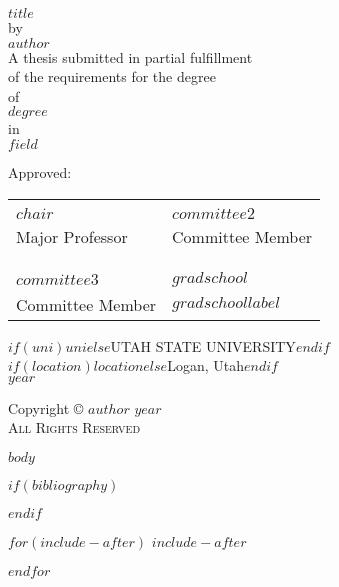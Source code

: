 \documentclass[12pt, oneside, letterpaper]{book}
\newcommand{\singlespaced}{\singlespacing}
\newcommand{\doublespaced}{\doublespacing}
\renewcommand{\maketitle}{
	\thispagestyle{empty}
	\vspace*{\fill}
	\begin{center}
	\doublespaced
	\MakeUppercase{$title$}\\
	by\\
	$author$ \\
	\singlespaced
	A dissertation submitted in partial fulfillment\\
	of the requirements for the degree \\
	\doublespaced
	of\\
	\MakeUppercase{$degree$} \\
	in\\
	\singlespaced
  $field$ \\
	\end{center}

	\vspace{20pt}
	\noindent Approved: \\
	\vspace{30pt}
	\noindent
	\begin{tabular}{ll}
    \makebox[2.75in]{\hrulefill} & \makebox[2.75in]{\hrulefill}\\
    $chair$                      & $committee2$ \\
    Major Professor              & Committee Member \\
    & \\
    & \\
    \makebox[2.75in]{\hrulefill} & \makebox[2.75in]{\hrulefill}\\
    $committee3$                 & $committee4$ \\
    Committee Member             & Committee Member \\
    & \\
    & \\
    \makebox[2.75in]{\hrulefill} & \makebox[2.75in]{\hrulefill}\\
    $committee5$                 & $gradschool$ \\
    Committee Member             & $gradschoollabel$ \\

    \end{tabular}

  \vspace{20pt}
    \begin{center}
	  \singlespacing
      $if(uni)$\MakeUppercase{$uni$}$else$UTAH STATE UNIVERSITY$endif$\\
	    $if(location)$$location$$else$Logan, Utah$endif$\\
	    \doublespacing
	    $year$
	  \end{center}
	\vspace*{\fill}
	\clearpage
}
\renewcommand{\maketitle}{
	\thispagestyle{empty}
	\vspace*{\fill}
	\begin{center}
	\doublespaced
	\MakeUppercase{$title$}\\
	by\\
	$author$ \\
	\singlespaced
	A thesis submitted in partial fulfillment\\
	of the requirements for the degree \\
	\doublespaced
	of\\
	\MakeUppercase{$degree$} \\
	in\\
	\singlespaced
  $field$ \\
	\end{center}

	\vspace{20pt}
	\noindent Approved: \\
	\vspace{30pt}
	\noindent
	\begin{tabular}{ll}
    \makebox[2.75in]{\hrulefill} & \makebox[2.75in]{\hrulefill}\\
    $chair$                      & $committee2$ \\
    Major Professor              & Committee Member \\
    & \\
    & \\
    \makebox[2.75in]{\hrulefill} & \makebox[2.75in]{\hrulefill}\\
    $committee3$                 & $gradschool$ \\
    Committee Member             & $gradschoollabel$ \\

    \end{tabular}

  \vspace{20pt}
    \begin{center}
	  \singlespacing
      $if(uni)$\MakeUppercase{$uni$}$else$UTAH STATE UNIVERSITY$endif$\\
	    $if(location)$$location$$else$Logan, Utah$endif$\\
	    \doublespacing
	    $year$
	  \end{center}
	\vspace*{\fill}
	\clearpage
}
\newcommand{\copyrightpage}{
	\vspace*{\fill}
  \begin{center}
	\doublespacing
	Copyright \hspace{3pt}
	  \scshape \small \copyright  \hspace{3pt}
	  $author$ \hspace{3pt} $year$ \\
	All Rights Reserved
  \end{center}
	\vspace*{\fill}
}
\begin{document}
\maketitle

\pagestyle{empty}
\copyrightpage

$body$

$if(bibliography)$

$endif$

$for(include-after)$
$include-after$

$endfor$
\end{document}
